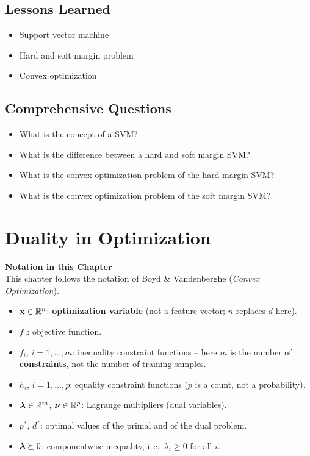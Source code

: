 \subsection{Lessons Learned}
  \begin{itemize}
    \item Support vector machine 
    \item Hard and soft margin problem 
    \item Convex optimization 
  \end{itemize}
 
\subsection{Comprehensive Questions}
 
  \begin{itemize}
    \item What is the concept of a SVM? 
    \item What is the difference between a hard and soft margin SVM? 
    \item What is the convex optimization problem of the hard margin SVM? 
    \item What is the convex optimization problem of the soft margin SVM?
  \end{itemize}
  
\section{Duality in Optimization}

\textbf{Notation in this Chapter} \\
This chapter follows the notation of Boyd \& Vandenberghe (\emph{Convex Optimization}).\autocite{boyd2004}
{\small
\begin{itemize}
  \item $\bm{\mathrm{x}}\in\mathbb{R}^n$: \textbf{optimization variable} (not a feature vector; $n$ replaces $d$ here).
  \item $f_0$: objective function.
  \item $f_i$, $i=1,\dots,m$: inequality constraint functions -- here $m$ is the number of \textbf{constraints}, not the number of training samples.
  \item $h_i$, $i=1,\dots,p$: equality constraint functions ($p$ is a count, not a probability).
  \item $\bm{\mathrm{\lambda}}\in\mathbb{R}^m$, $\bm{\mathrm{\nu}}\in\mathbb{R}^p$: Lagrange multipliers (dual variables).
  \item $p^*$, $d^*$: optimal values of the primal and of the dual problem.
  \item $\bm{\mathrm{\lambda}}\succeq 0$: componentwise inequality, i.\,e.\ $\lambda_i\geq 0$ for all $i$.
\end{itemize}
}


